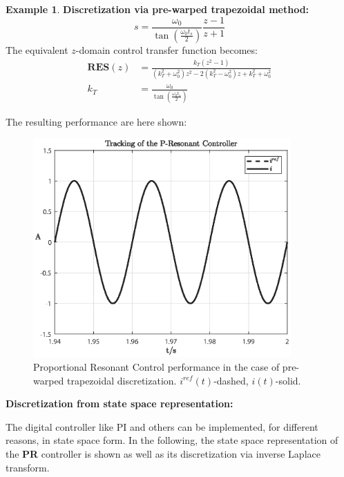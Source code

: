 \documentclass[11pt,a4paper,oneside]{book}
\numberwithin{equation}{section}
\theoremstyle{it}
\theoremstyle{definition}
\newtheorem{example}{Example}[chapter]
\begin{document}
\begin{example}
	\vspace{5mm}
	\noindent\textbf{Discretization via pre-warped trapezoidal method:} $$ s = 
	\frac{\omega_0}{\tan(\frac{\omega_0 t_s}{2})} \frac{z-1}{z+1}$$
	\noindent The equivalent $z$-domain control transfer function becomes:
	\begin{equation}\label{eqRESP3}
		\begin{aligned}
			\textbf{RES}(z) &=  
			\frac{k_T(z^2-1)}{(k_T^2+\omega_0^2)z^2-2(k_T^2-\omega_0^2)z+k_T^2+\omega_0^2}
			 \\[6pt]
			k_T &= \frac{\omega_0}{\tan(\frac{\omega_0 t_s}{2})}
		\end{aligned}
	\end{equation}
	
	\noindent The resulting performance are here shown:
	\begin{figure}[H]
		\centering
		\includegraphics[width = 280pt, keepaspectratio]{figures/PRtustin_performance.eps}
		\captionsetup{width=0.5\textwidth, font=small}		
		\caption{Proportional Resonant Control performance in the case of pre-warped trapezoidal discretization. $i^{ref}(t)$-dashed, $i(t)$-solid.}
		\label{figure_tustin}
	\end{figure}
	
	\noindent\textbf{Discretization from state space representation:}
	
	The digital controller like PI and others can be implemented, for different 
	reasons, in state space form. In the following, the state space 
	representation of the \textbf{PR} controller is shown as well as its 
	discretization via inverse Laplace transform.
	

\end{example}
\end{document}
